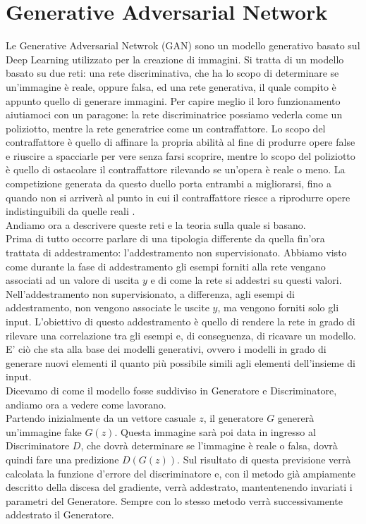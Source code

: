 \section{Generative Adversarial Network}
Le Generative Adversarial Netwrok (GAN) sono un modello generativo basato sul Deep Learning \cite{brownlee2019generative} utilizzato per la creazione di immagini. Si tratta di un modello basato su due reti: una rete discriminativa, che ha lo scopo di determinare se un'immagine è reale, oppure falsa, ed una rete generativa, il quale compito è appunto quello di generare immagini. Per capire meglio il loro funzionamento aiutiamoci con un paragone: la rete discriminatrice possiamo vederla come un poliziotto, mentre la rete generatrice come un contraffattore. Lo scopo del contraffattore è quello di affinare la propria abilità al fine di produrre opere false e riuscire a spacciarle per vere senza farsi scoprire, mentre lo scopo del poliziotto è quello di ostacolare il contraffattore rilevando se un'opera è reale o meno. La competizione generata da questo duello porta entrambi a migliorarsi, fino a quando non si arriverà al punto in cui il contraffattore riesce a riprodurre opere indistinguibili da quelle reali \cite{goodfellow2014generative}.
\\
Andiamo ora a descrivere queste reti e la teoria sulla quale si basano.
\\Prima di tutto occorre parlare di una tipologia differente da quella fin'ora trattata di addestramento: l'addestramento non supervisionato. Abbiamo visto come durante la fase di addestramento gli esempi forniti alla rete vengano associati ad un valore di uscita $y$ e di come la rete si addestri su questi valori. Nell'addestramento non supervisionato, a differenza, agli esempi di addestramento, non vengono associate le uscite $y$, ma vengono forniti solo gli input. L'obiettivo di questo addestramento è quello di rendere la rete in grado di rilevare una correlazione tra gli esempi e, di conseguenza, di ricavare un modello. E' ciò che sta alla base dei modelli generativi, ovvero i modelli in grado di generare nuovi elementi il quanto più possibile simili agli elementi dell'insieme di input.
\\
Dicevamo di come il modello fosse suddiviso in Generatore e Discriminatore, andiamo ora a vedere come lavorano.
\\Partendo inizialmente da un vettore casuale $z$, il generatore $G$ genererà un'immagine fake $G(z)$. Questa immagine sarà poi data in ingresso al Discriminatore $D$, che dovrà determinare se l'immagine è reale o falsa, dovrà quindi fare una predizione $D(G(z))$. Sul risultato di questa previsione verrà calcolata la funzione d'errore del discriminatore e, con il metodo già ampiamente descritto della discesa del gradiente, verrà addestrato, mantentenendo invariati i parametri del Generatore. Sempre con lo stesso metodo verrà successivamente addestrato il Generatore.

